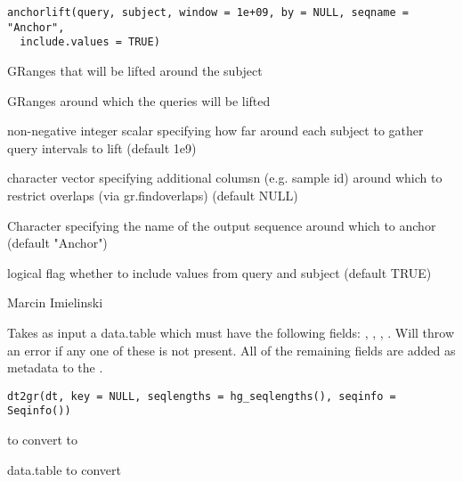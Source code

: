 \documentclass[a4paper]{book}
\begin{document}
\begin{Usage}
\begin{verbatim}
anchorlift(query, subject, window = 1e+09, by = NULL, seqname = "Anchor",
  include.values = TRUE)
\end{verbatim}
\end{Usage}
%
\begin{Arguments}
\begin{ldescription}
\item[\code{query}] GRanges that will be lifted around the subject

\item[\code{subject}] GRanges around which the queries will be lifted

\item[\code{window}] non-negative integer scalar specifying how far around each subject to gather query intervals to lift (default 1e9)

\item[\code{by}] character vector specifying additional columsn (e.g. sample id) around which to restrict overlaps (via gr.findoverlaps) (default NULL)

\item[\code{seqname}] Character specifying the name of the output sequence around which to anchor (default "Anchor")

\item[\code{include.values}] logical flag whether to include values from query and subject (default TRUE)
\end{ldescription}
\end{Arguments}
%
\begin{Author}\relax
Marcin Imielinski
\end{Author}
%
\begin{Description}\relax
Takes as input a data.table which must have the following fields: , , , . Will throw
an error if any one of these is not present.
All of the remaining fields are added as metadata to the .
\end{Description}
%
\begin{Usage}
\begin{verbatim}
dt2gr(dt, key = NULL, seqlengths = hg_seqlengths(), seqinfo = Seqinfo())
\end{verbatim}
\end{Usage}
%
\begin{Arguments}
\begin{ldescription}
\item[\code{dt}]  to convert to 

\item[\code{dt}] data.table to convert
\end{ldescription}
\end{Arguments}
\end{document}
